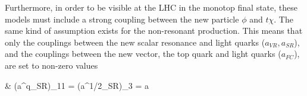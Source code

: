 Furthermore, in order to be visible at the LHC in the monotop final state, 
these models must include a strong coupling between the new particle $\phi$ and $t\chi$.
The same kind of assumption exists for the non-resonant production. 
This means that only the couplings between the new scalar resonance and  
light quarks ($a_{VR}, a_{SR}$), and the couplings between the new vector, the top quark 
and light quarks ($a_{FC}$), are set to non-zero values 

\be\label{eq:a}\bsp
& (a^q_{SR})_{11} = (a^{1/2}_{SR})_3 = a
\esp 
\ee

 
%





